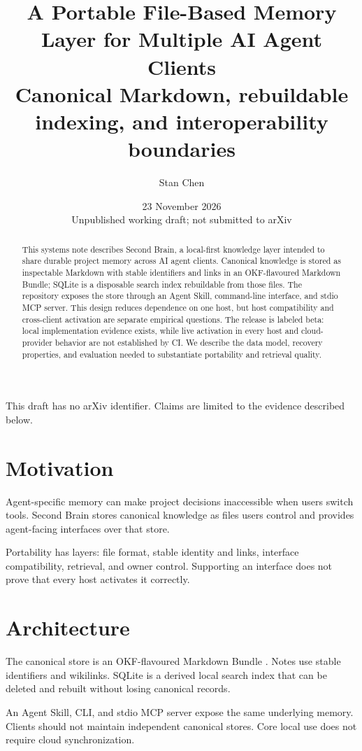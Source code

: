 \documentclass[11pt]{article}
\title{A Portable File-Based Memory Layer for Multiple AI Agent Clients\\\large Canonical Markdown, rebuildable indexing, and interoperability boundaries}
\author{Stan Chen}
\date{23 November 2026\\[4pt]\small Unpublished working draft; not submitted to arXiv}
\begin{document}
\maketitle
\begin{center}\small This draft has no arXiv identifier. Claims are limited to the evidence described below.\end{center}
\begin{abstract}
This systems note describes Second Brain, a local-first knowledge layer intended to share durable project memory across AI agent clients. Canonical knowledge is stored as inspectable Markdown with stable identifiers and links in an OKF-flavoured Markdown Bundle; SQLite is a disposable search index rebuildable from those files. The repository exposes the store through an Agent Skill, command-line interface, and stdio MCP server. This design reduces dependence on one host, but host compatibility and cross-client activation are separate empirical questions. The release is labeled beta: local implementation evidence exists, while live activation in every host and cloud-provider behavior are not established by CI. We describe the data model, recovery properties, and evaluation needed to substantiate portability and retrieval quality.
\end{abstract}
\section{Motivation}
Agent-specific memory can make project decisions inaccessible when users switch tools. Second Brain stores canonical knowledge as files users control and provides agent-facing interfaces over that store.\par
Portability has layers: file format, stable identity and links, interface compatibility, retrieval, and owner control. Supporting an interface does not prove that every host activates it correctly.\par
\section{Architecture}
The canonical store is an OKF-flavoured Markdown Bundle \cite{r1}. Notes use stable identifiers and wikilinks. SQLite is a derived local search index that can be deleted and rebuilt without losing canonical records.\par
An Agent Skill, CLI, and stdio MCP \cite{r2} server expose the same underlying memory. Clients should not maintain independent canonical stores. Core local use does not require cloud synchronization.\par
\end{document}
